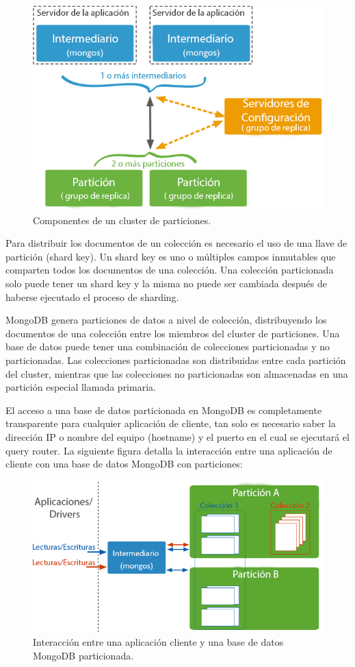 \begin{figure}[H]
	\centering
		\includegraphics[width=.7\textwidth]{figures/sharding}
	\caption{Componentes de un cluster de particiones.}
	\label{fig:sharding}
\end{figure}

Para distribuir los documentos de un colección es necesario el uso de una llave de partición (shard key). Un shard key es uno o 
múltiples campos inmutables que comparten todos los documentos de una colección. Una colección particionada solo puede tener un shard key
y la misma no puede ser cambiada después de haberse ejecutado el proceso de sharding.

MongoDB genera particiones de datos a nivel de colección, distribuyendo los documentos de una colección entre los miembros
del cluster de particiones. Una base de datos puede tener una combinación de colecciones particionadas y no particionadas.
Las colecciones particionadas son distribuidas entre cada partición del cluster, mientras que las colecciones no particionadas son
almacenadas en una partición especial llamada primaria.

El acceso a una base de datos particionada en MongoDB es completamente transparente para cualquier aplicación de cliente, tan
solo es necesario saber la dirección IP o nombre del equipo (hostname) y el puerto en el cual se ejecutará el query router.
La siguiente figura detalla la interacción entre una aplicación de cliente con una base de datos MongoDB con particiones:

\begin{figure}[H]
	\centering
		\includegraphics[width=.7\textwidth]{figures/sharding_apps}
	\caption{Interacción entre una aplicación cliente y una base de datos MongoDB particionada.}
	\label{fig:sharding_apps}
\end{figure}

